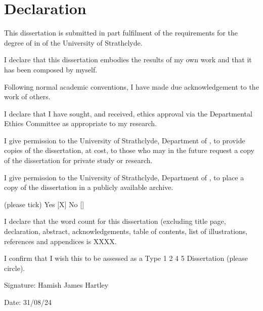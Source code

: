\section*{Declaration}
This dissertation is submitted in part fulfilment of the requirements for the degree of \degreename\; in \coursename\; of the University of Strathclyde. 

I declare that this dissertation embodies the results of my own work and that it has been composed by myself. 

Following normal academic conventions, I have made due acknowledgement to the work of others. 

I declare that I have sought, and received, ethics approval via the Departmental Ethics Committee as appropriate to my research. 

I give permission to the University of Strathclyde, Department of \deptname, to provide copies of the dissertation, at cost, to those who may in the future request a copy of the dissertation for private study or research. 

I give permission to the University of Strathclyde, Department of \deptname, to place a copy of the dissertation in a publicly available archive. 

(please tick) Yes [\:X\:] No [\quad] 

I declare that the word count for this dissertation (excluding title page, declaration, abstract, acknowledgements, table of contents, list of illustrations, references and appendices is XXXX.


I confirm that I wish this to be assessed as a Type 1 2  4 5 Dissertation (please circle).

\vspace{10mm}

Signature: Hamish James Hartley

\vspace{10mm}

Date: 31/08/24
